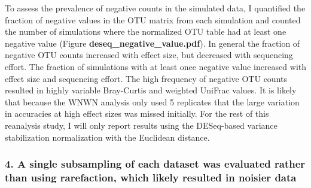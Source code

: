 \documentclass[
]{article}
\begin{document}
To assess the prevalence of negative counts in the simulated data, I
quantified the fraction of negative values in the OTU matrix from each
simulation and counted the number of simulations where the normalized
OTU table had at least one negative value (Figure
\textbf{deseq\_negative\_value.pdf}). In general the fraction of
negative OTU counts increased with effect size, but decreased with
sequencing effort. The fraction of simulations with at least onee
negative value increased with effect size and sequencing effort. The
high frequency of negative OTU counts resulted in highly variable
Bray-Curtis and weighted UniFrac values. It is likely that because the
WNWN analysis only used 5 replicates that the large variation in
accuracies at high effect sizes was missed initially. For the rest of
this reanalysis study, I will only report results using the DESeq-based
variance stabilization normalization with the Euclidean distance.

\hypertarget{a-single-subsampling-of-each-dataset-was-evaluated-rather-than-using-rarefaction-which-likely-resulted-in-noisier-data}{%
\subsubsection{4. A single subsampling of each dataset was evaluated
rather than using rarefaction, which likely resulted in noisier
data}\label{a-single-subsampling-of-each-dataset-was-evaluated-rather-than-using-rarefaction-which-likely-resulted-in-noisier-data}}
\end{document}
